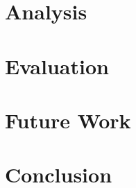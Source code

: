 \documentclass{sigplanconf}
\begin{document}
\section{Analysis}
\label{sec:analysis}


\section{Evaluation}
\label{sec:evaluation}


\section{Future Work}
\label{sec:future}


\section{Conclusion}
\label{sec:conclusion}





% 

{


}
\end{document}
